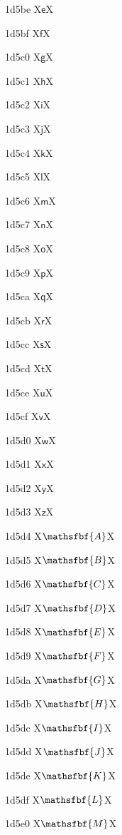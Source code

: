 \documentclass[11pt]{article}
\begin{document}
1d5be X{\ensuremath{\mathsf{e}}}X

1d5bf X{\ensuremath{\mathsf{f}}}X

1d5c0 X{\ensuremath{\mathsf{g}}}X

1d5c1 X{\ensuremath{\mathsf{h}}}X

1d5c2 X{\ensuremath{\mathsf{i}}}X

1d5c3 X{\ensuremath{\mathsf{j}}}X

1d5c4 X{\ensuremath{\mathsf{k}}}X

1d5c5 X{\ensuremath{\mathsf{l}}}X

1d5c6 X{\ensuremath{\mathsf{m}}}X

1d5c7 X{\ensuremath{\mathsf{n}}}X

1d5c8 X{\ensuremath{\mathsf{o}}}X

1d5c9 X{\ensuremath{\mathsf{p}}}X

1d5ca X{\ensuremath{\mathsf{q}}}X

1d5cb X{\ensuremath{\mathsf{r}}}X

1d5cc X{\ensuremath{\mathsf{s}}}X

1d5cd X{\ensuremath{\mathsf{t}}}X

1d5ce X{\ensuremath{\mathsf{u}}}X

1d5cf X{\ensuremath{\mathsf{v}}}X

1d5d0 X{\ensuremath{\mathsf{w}}}X

1d5d1 X{\ensuremath{\mathsf{x}}}X

1d5d2 X{\ensuremath{\mathsf{y}}}X

1d5d3 X{\ensuremath{\mathsf{z}}}X

1d5d4 X{\ensuremath{\mathsfbf{A}}}X

1d5d5 X{\ensuremath{\mathsfbf{B}}}X

1d5d6 X{\ensuremath{\mathsfbf{C}}}X

1d5d7 X{\ensuremath{\mathsfbf{D}}}X

1d5d8 X{\ensuremath{\mathsfbf{E}}}X

1d5d9 X{\ensuremath{\mathsfbf{F}}}X

1d5da X{\ensuremath{\mathsfbf{G}}}X

1d5db X{\ensuremath{\mathsfbf{H}}}X

1d5dc X{\ensuremath{\mathsfbf{I}}}X

1d5dd X{\ensuremath{\mathsfbf{J}}}X

1d5de X{\ensuremath{\mathsfbf{K}}}X

1d5df X{\ensuremath{\mathsfbf{L}}}X

1d5e0 X{\ensuremath{\mathsfbf{M}}}X
\end{document}
